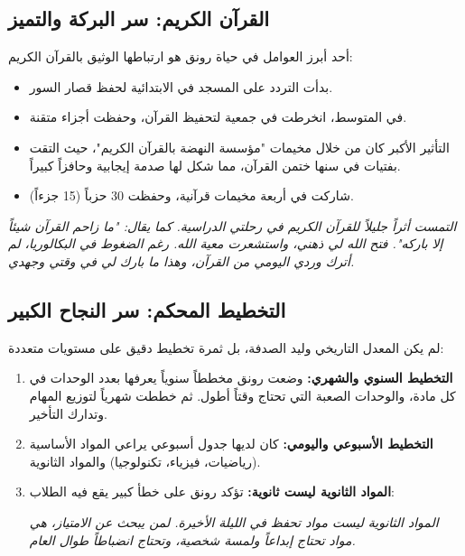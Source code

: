 \documentclass[12pt,a4paper]{book}
\newcommand{\quoteAr}[1]{%
	\begin{myquote}
		\itshape #1
	\end{myquote}
}
\begin{document}
	\subsection{القرآن الكريم: سر البركة والتميز}
	أحد أبرز العوامل في حياة رونق هو ارتباطها الوثيق بالقرآن الكريم:
	\begin{itemize}
		\item بدأت التردد على المسجد في الابتدائية لحفظ قصار السور.
		\item في المتوسط، انخرطت في جمعية لتحفيظ القرآن، وحفظت أجزاء متقنة.
		\item التأثير الأكبر كان من خلال مخيمات "مؤسسة النهضة بالقرآن الكريم"، حيث التقت بفتيات في سنها ختمن القرآن، مما شكل لها صدمة إيجابية وحافزاً كبيراً.
		\item شاركت في أربعة مخيمات قرآنية، وحفظت 30 حزباً (15 جزءاً).
	\end{itemize}
	\quoteAr{التمست أثراً جليلاً للقرآن الكريم في رحلتي الدراسية. كما يقال: "ما زاحم القرآن شيئاً إلا باركه". فتح الله لي ذهني، واستشعرت معية الله. رغم الضغوط في البكالوريا، لم أترك وردي اليومي من القرآن، وهذا ما بارك لي في وقتي وجهدي.}
	
	\subsection{التخطيط المحكم: سر النجاح الكبير}
		\label{sec:ideal-daily-system3}
		\label{sec:owner-experiences12}
	لم يكن المعدل التاريخي وليد الصدفة، بل ثمرة تخطيط دقيق على مستويات متعددة:
	\begin{enumerate}
		\item \textbf{التخطيط السنوي والشهري:} وضعت رونق مخططاً سنوياً يعرفها بعدد الوحدات في كل مادة، والوحدات الصعبة التي تحتاج وقتاً أطول. ثم خططت شهرياً لتوزيع المهام وتدارك التأخير.
		\item \textbf{التخطيط الأسبوعي واليومي:} كان لديها جدول أسبوعي يراعي المواد الأساسية (رياضيات، فيزياء، تكنولوجيا) والمواد الثانوية. 
		\item \textbf{المواد الثانوية ليست ثانوية:} تؤكد رونق على خطأ كبير يقع فيه الطلاب:
		\quoteAr{المواد الثانوية ليست مواد تحفظ في الليلة الأخيرة. لمن يبحث عن الامتياز، هي مواد تحتاج إبداعاً ولمسة شخصية، وتحتاج انضباطاً طوال العام.}
	\end{enumerate}
	
\end{document}
